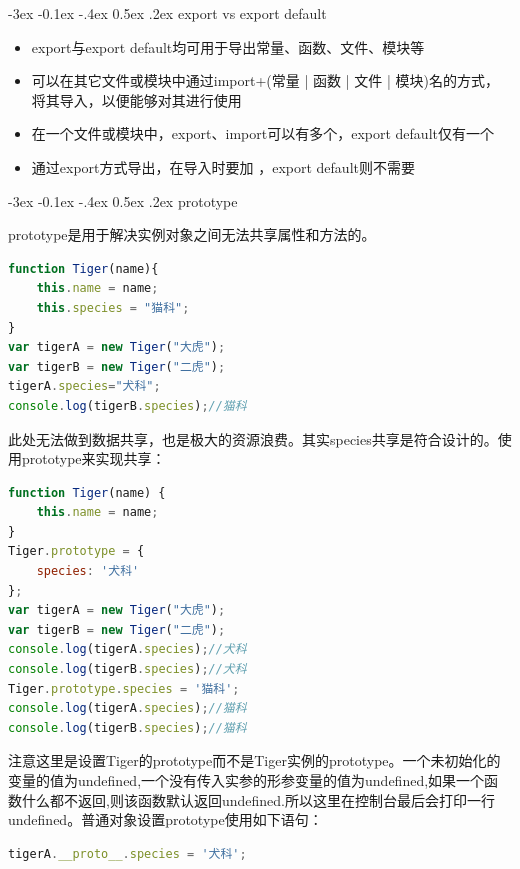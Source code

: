 \documentclass[12pt]{book}
\makeatletter
\numberwithin{dummy}{section}
\theoremstyle{ocrenumbox}
\theoremstyle{blacknumex}
\theoremstyle{blacknumbox}
\theoremstyle{ocrenum}
\renewcommand{\subsection}{\@startsection {subsection}{2}{\z@}
	{-3ex \@plus -0.1ex \@minus -.4ex}
	{0.5ex \@plus.2ex }
	{\normalfont\sffamily\bfseries}}
\makeatother
\begin{document}
\subsection{export vs export default}

\begin{itemize}
	\item{export与export default均可用于导出常量、函数、文件、模块等}
	\item{可以在其它文件或模块中通过import+(常量 | 函数 | 文件 | 模块)名的方式，将其导入，以便能够对其进行使用}
	\item{在一个文件或模块中，export、import可以有多个，export default仅有一个}
	\item{通过export方式导出，在导入时要加{ }，export default则不需要}
\end{itemize}

\subsection{prototype}

prototype是用于解决实例对象之间无法共享属性和方法的。

\begin{lstlisting}[language=Javascript]
function Tiger(name){
	this.name = name;
	this.species = "猫科";
}
var tigerA = new Tiger("大虎");
var tigerB = new Tiger("二虎");
tigerA.species="犬科";
console.log(tigerB.species);//猫科
\end{lstlisting}

此处无法做到数据共享，也是极大的资源浪费。其实species共享是符合设计的。使用prototype来实现共享：

\begin{lstlisting}[language=Javascript]
function Tiger(name) {
	this.name = name;
}
Tiger.prototype = {
	species: '犬科'
};
var tigerA = new Tiger("大虎");
var tigerB = new Tiger("二虎");
console.log(tigerA.species);//犬科
console.log(tigerB.species);//犬科
Tiger.prototype.species = '猫科';
console.log(tigerA.species);//猫科
console.log(tigerB.species);//猫科
\end{lstlisting}

注意这里是设置Tiger的prototype而不是Tiger实例的prototype。一个未初始化的变量的值为undefined,一个没有传入实参的形参变量的值为undefined,如果一个函数什么都不返回,则该函数默认返回undefined.所以这里在控制台最后会打印一行undefined。普通对象设置prototype使用如下语句：

\begin{lstlisting}[language=Javascript]
tigerA.__proto__.species = '犬科';
\end{lstlisting}
\end{document}
